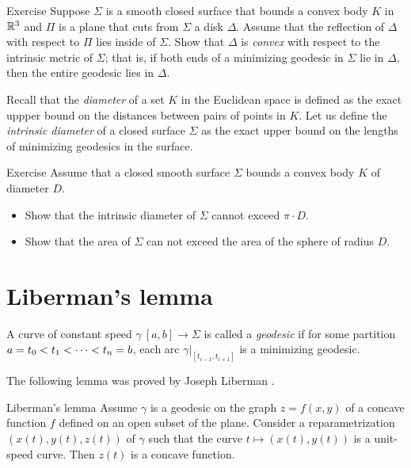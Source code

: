 \begin{thm}{Exercise}
Suppose $\Sigma$ is a smooth closed surface that bounds a convex body $K$ 
in $\mathbb{R}^3$ 
and $\Pi$ is a plane that cuts from $\Sigma$ a disk $\Delta$.
Assume that the reflection of $\Delta$ with respect to $\Pi$ lies inside of $\Sigma$.
Show that $\Delta$ is \emph{convex} with respect to the intrinsic metric  of $\Sigma$;
that is, 
if both ends of a minimizing geodesic in $\Sigma$ 
lie in $\Delta$,
then the entire geodesic lies in $\Delta$.
\end{thm}

Recall that the \emph{diameter} of a set $K$ in the Euclidean space is defined as the exact uppper bound on the distances between pairs of points in $K$.
Let us define the \emph{intrinsic diameter} of a closed surface $\Sigma$ as the exact upper bound on the lengths of minimizing geodesics in the surface.

\begin{thm}{Exercise}\label{ex:intrinsic-diameter}
Assume that a closed smooth surface $\Sigma$ bounds a convex body $K$ of diameter $D$.
\begin{itemize}
\item Show that the intrinsic diameter of $\Sigma$ cannot exceed $\pi\cdot D$.
\item Show that the area of $\Sigma$ can not exceed the area of the sphere of radius $D$.
\end{itemize}

\end{thm}%


\section{Liberman's lemma}

A curve of constant speed $\gamma\:[a,b]\to \Sigma$ is called a \emph{geodesic}  if for some partition $a\z=t_0<t_1<\dots <t_n=b$, each arc $\gamma|_{[t_{i-1},t_{i+1}]}$ is a minimizing geodesic.

The following lemma was proved by Joseph Liberman \cite{liberman}.

\begin{thm}{Liberman's lemma}
Assume $\gamma$ is a geodesic on the graph $z=f(x,y)$ of a concave function $f$ defined on an open subset of the plane.
Consider a reparametrization $(x(t),y(t),z(t))$ of $\gamma$ such that the curve  $t\mapsto (x(t),y(t))$ is a unit-speed curve.
Then $z(t)$ is a concave function.
\end{thm}


